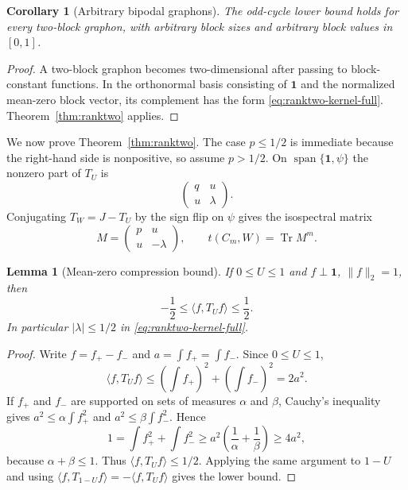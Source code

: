 \documentclass[11pt]{article}
\newtheorem{lemma}[theorem]{Lemma}
\newtheorem{corollary}[theorem]{Corollary}
\newcommand{\one}{\mathbf 1}
\newcommand{\Tr}{\operatorname{Tr}}
\begin{document}
\begin{corollary}[Arbitrary bipodal graphons]\label{cor:bipodal}
The odd-cycle lower bound holds for every two-block graphon, with arbitrary block sizes and arbitrary block values in $[0,1]$.
\end{corollary}

\begin{proof}
A two-block graphon becomes two-dimensional after passing to block-constant functions.  In the orthonormal basis consisting of $\one$ and the normalized mean-zero block vector, its complement has the form \eqref{eq:ranktwo-kernel-full}.  Theorem~\ref{thm:ranktwo} applies.
\end{proof}

We now prove Theorem~\ref{thm:ranktwo}.  The case $p\le1/2$ is immediate because the right-hand side is nonpositive, so assume $p>1/2$.  On $\operatorname{span}\{\one,\psi\}$ the nonzero part of $T_U$ is
\[
        \begin{pmatrix}q&u\\ u&\lambda\end{pmatrix}.
\]
Conjugating $T_W=J-T_U$ by the sign flip on $\psi$ gives the isospectral matrix
\begin{equation}\label{eq:ranktwo-M}
        M=\begin{pmatrix}p&u\\ u&-\lambda\end{pmatrix},
        \qquad t(C_m,W)=\Tr M^m.
\end{equation}

\begin{lemma}[Mean-zero compression bound]\label{lem:half-bound-full}
If $0\le U\le1$ and $f\perp\one$, $\|f\|_2=1$, then
\[
        -\frac12\le\langle f,T_Uf\rangle\le\frac12.
\]
In particular $|\lambda|\le1/2$ in \eqref{eq:ranktwo-kernel-full}.
\end{lemma}

\begin{proof}
Write $f=f_+-f_-$ and $a=\int f_+=\int f_-$.  Since $0\le U\le1$,
\[
        \langle f,T_Uf\rangle
        \le \left(\int f_+\right)^2+\left(\int f_-\right)^2=2a^2.
\]
If $f_+$ and $f_-$ are supported on sets of measures $\alpha$ and $\beta$, Cauchy's inequality gives $a^2\le\alpha\int f_+^2$ and $a^2\le\beta\int f_-^2$.  Hence
\[
        1=\int f_+^2+\int f_-^2\ge a^2\left(\frac1\alpha+\frac1\beta\right)\ge4a^2,
\]
because $\alpha+\beta\le1$.  Thus $\langle f,T_Uf\rangle\le1/2$.  Applying the same argument to $1-U$ and using $\langle f,T_{1-U}f\rangle=-\langle f,T_Uf\rangle$ gives the lower bound.
\end{proof}
\end{document}
